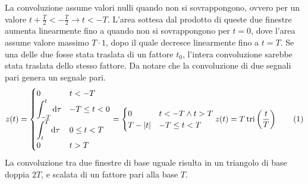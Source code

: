 \documentclass{article}
\newcommand{\tri}{\mathrm{tri}}
\newcommand{\df}{\mathrm{d}}
\newcommand{\tageq}{\tag{\stepcounter{equation}\theequation}}
\begin{document}
La convoluzione assume valori nulli quando non si sovrappongono, ovvero per un valore $t+\displaystyle\frac{T}{2}<-\frac{T}{2}\to t<-T$. L'area sottesa dal prodotto 
di queste due finestre aumenta linearmente fino a quando non si sovrappongono per $t=0$, dove l'area assume valore massimo $T\cdot 1$, dopo il quale 
decresce linearmente fino a $t=T$. Se una delle due fosse stata traslata di un fattore $t_0$, l'intera convoluzione sarebbe stata traslata dello stesso fattore. Da notare 
che la convoluzione di due segnali pari genera un segnale pari.  
\begin{equation*}
    z(t)=\begin{cases}
        0&t<-T\\
        \displaystyle\int_{-T}^t\df\tau&-T\leq t<0\\
        \displaystyle\int_t^T\df\tau&0\leq t<T\\
        0&t>T
    \end{cases}=\begin{cases}
        0&t<-T\land t>T\\
        T-|t|&-T\leq t<T\\
    \end{cases}\\
    z(t)=T\,\tri \left(\displaystyle\frac{t}{T}\right)\tageq
\end{equation*}
La convoluzione tra due finestre di base uguale risulta in un triangolo di base doppia $2T$, e scalata di un fattore pari alla base $T$. 

\begin{center}
\end{center}
\end{document}
